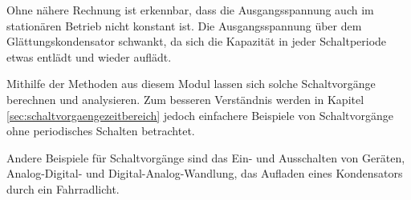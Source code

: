 \begin{frame}
{	Ohne nähere Rechnung ist erkennbar, dass die Ausgangsspannung auch im stationären Betrieb nicht konstant ist.
	Die Ausgangsspannung über dem Glättungskondensator schwankt, da sich die Kapazität in jeder Schaltperiode 
	etwas entlädt und wieder auflädt. 
	
	Mithilfe der Methoden aus diesem Modul lassen sich solche Schaltvorgänge berechnen und analysieren. 
	Zum besseren Verständnis werden in Kapitel \ref{sec:schaltvorgaengezeitbereich} jedoch einfachere Beispiele von
	Schaltvorgänge ohne periodisches Schalten betrachtet.

	Andere Beispiele für Schaltvorgänge sind das Ein- und Ausschalten von Geräten,
	Analog-Digital- und Digital-Analog-Wandlung, das Aufladen eines Kondensators durch ein Fahrradlicht.
}

%
%

\end{frame}


